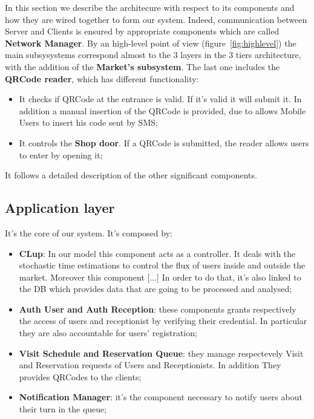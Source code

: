 In this section we describe the architecure with respect to its components and how they are wired together to form our system. 
Indeed, communication between Server and Clients is ensured by appropriate components which are called \textbf{Network Manager}. 
By an high-level point of view (figure~\ref{fig:highlevel}) the main subsysystems correspond almost to the 3 layers in the 3 tiers architecture, with the addition of the \textbf{Market's subsystem}. The last one includes the \textbf{QRCode reader}, which has different functionality:
\begin{itemize}
\item It checks if QRCode at the entrance is valid. If it's valid it will submit it. In addition a manual insertion of the QRCode is provided, due to allows Mobile Users to insert his code sent by SMS;
\item It controls the \textbf{Shop door}. If a QRCode is submitted, the reader allows users to enter by opening it;
\end{itemize}

It follows a detailed description of the other significant components.

\subsection{Application layer}
It's the core of our system. It's composed by:
\begin{itemize}
\item \textbf{CLup}: In our model this component acts as a controller. It deals with the stochastic time estimations to control the flux of users inside and outside the market. Moreover this component [...] 
In order to do that, it's also linked to the DB which provides data that are going to be processed and analysed;
\item \textbf{Auth User and Auth Reception}: these components grants respectively the access of users and receptionist by verifying their credential. In particular they are also accountable for users' registration;
\item \textbf{Visit Schedule and Reservation Queue}: they manage respectevely Visit and Reservation requests of Users and Receptionists. In addition They provides QRCodes to the clients;
\item \textbf{Notification Manager}: it's the component necessary to notify users about their turn in the queue;
\end{itemize}


